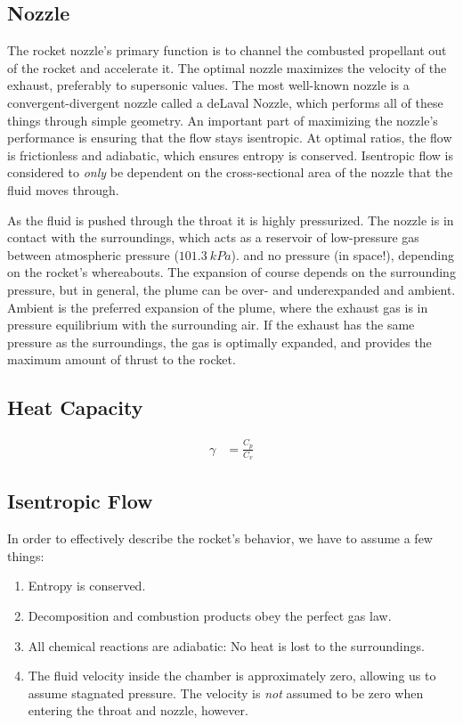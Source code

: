 \subsection{Nozzle}

	The rocket nozzle's primary function is to channel the combusted propellant out of the rocket and accelerate it. The optimal nozzle maximizes the velocity of the exhaust, preferably to supersonic values. The most well-known nozzle is a convergent-divergent nozzle called a deLaval Nozzle, which performs all of these things through simple geometry. An important part of maximizing the nozzle's performance is ensuring that the flow stays isentropic. At optimal ratios, the flow is frictionless and adiabatic, which ensures entropy is conserved. Isentropic flow is considered to \emph{only} be dependent on the cross-sectional area of the nozzle that the fluid moves through. \cite{nakkanozz}

	As the fluid is pushed through the throat it is highly pressurized. The nozzle is in contact with the surroundings, which acts as a reservoir of low-pressure gas between atmospheric pressure ($\SI{101.3}{kPa}$).
	and no pressure (in space!), depending on the rocket's whereabouts. The expansion of course depends on the surrounding pressure, but in general, the plume can be over- and underexpanded and ambient. Ambient is the preferred expansion of the plume, where the exhaust gas is in pressure equilibrium with the surrounding air. If the exhaust has the same pressure as the surroundings, the gas is optimally expanded, and provides the maximum amount of thrust to the rocket. \cite{robertnozzle}

\subsection{Heat Capacity}

 \begin{align}
	 \gamma &= \frac{C_p}{C_v}
 \end{align}

\subsection{Isentropic Flow}

	In order to effectively describe the rocket's behavior, we have to assume a few things:
	\begin{enumerate}[topsep=0pt,itemsep=-1ex,partopsep=1ex,parsep=1ex]
		\item{Entropy is conserved.}
		\item{Decomposition and combustion products obey the perfect gas law.}
		\item{All chemical reactions are adiabatic: No heat is lost to the surroundings.}
		\item{The fluid velocity inside the chamber is approximately zero, allowing us to assume stagnated pressure. The velocity is \emph{not} assumed to be zero when entering the throat and nozzle, however.}
	\end{enumerate}

